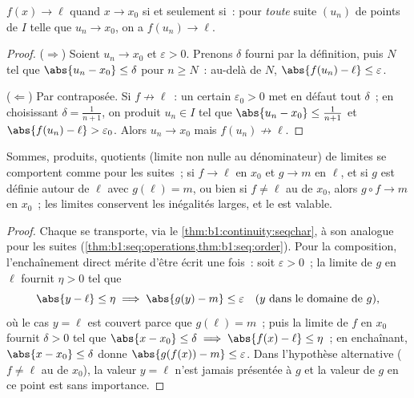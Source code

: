 \begin{theorem}\label{thm:b1:continuity:seqchar}
$f(x) \to \ell$ quand $x \to x_0$ si et seulement si~: pour
\emph{toute} suite $(u_n)$ de points de $I$ telle que $u_n \to x_0$,
on a $f(u_n) \to \ell$.
\end{theorem}

\begin{proof}
($\Rightarrow$) Soient $u_n \to x_0$ et $\varepsilon > 0$. Prenons
$\delta$ fourni par la définition, puis $N$ tel que $\abs{u_n - x_0}
\leq \delta$ pour $n \geq N$~: au-delà de $N$, $\abs{f(u_n) - \ell}
\leq \varepsilon$.

($\Leftarrow$) Par contraposée. Si $f \not\to \ell$~: un certain
$\varepsilon_0 > 0$ met en défaut tout $\delta$~; en choisissant
$\delta = \frac{1}{n+1}$, on produit $u_n \in I$ tel que $\abs{u_n -
x_0} \leq \frac{1}{n+1}$ et $\abs{f(u_n) - \ell} > \varepsilon_0$.
Alors $u_n \to x_0$ mais $f(u_n) \not\to \ell$.
\end{proof}

\begin{corollary}\label{cor:b1:continuity:operations}
Sommes, produits, quotients (limite non nulle au dénominateur) de
limites se comportent comme pour les suites~; si $f \to \ell$ en $x_0$
et $g \to m$ en $\ell$, et si $g$ est définie autour de $\ell$ avec
$g(\ell) = m$, ou bien si $f \neq \ell$ au  de $x_0$, alors
$g \circ f \to m$ en $x_0$~; les limites conservent les inégalités
larges, et le  est valable.
\end{corollary}

\begin{proof}
Chaque  se transporte, via le
\cref{thm:b1:continuity:seqchar}, à son analogue pour les suites
(\cref{thm:b1:seq:operations,thm:b1:seq:order}). Pour la composition,
l'enchaînement direct mérite d'être écrit une fois~: soit
$\varepsilon > 0$~; la limite de $g$ en $\ell$ fournit $\eta > 0$ tel
que
\[
\abs{y - \ell} \leq \eta \implies \abs{g(y) - m} \leq
\varepsilon \quad (y \text{ dans le domaine de } g),
\]
où le cas $y = \ell$ est couvert parce que $g(\ell) = m$~; puis la
limite de $f$ en $x_0$ fournit $\delta > 0$ tel que $\abs{x -
x_0} \leq \delta \implies \abs{f(x) - \ell} \leq \eta$~; en
enchaînant, $\abs{x - x_0} \leq \delta$ donne $\abs{g(f(x)) - m} \leq
\varepsilon$. Dans l'hypothèse alternative ($f \neq \ell$ au
 de $x_0$), la valeur $y = \ell$ n'est jamais présentée à
$g$ et la valeur de $g$ en ce point est sans importance.
\end{proof}

